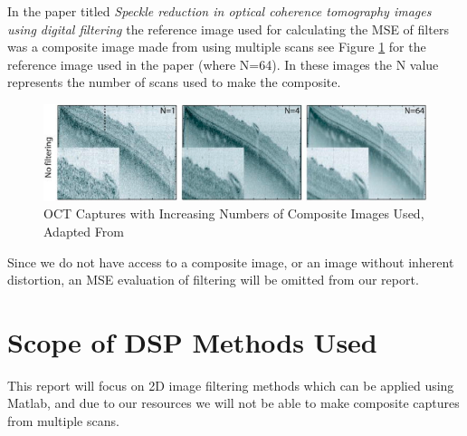 \documentclass[%
reprint,
showpacs,preprintnumbers,
bibnotes,
amsmath,amssymb,
aps,
pra,
]{revtex4-1}
\begin{document}
	  	In the paper titled \textit{Speckle reduction in optical coherence tomography images using digital filtering} \cite{ozcan_speckle_2007} the reference image used for calculating the MSE of filters was a composite image made from using multiple scans see Figure \ref{fig:Composite} for the reference image used in the paper (where N=64). In these images the N value represents the number of scans used to make the composite.

	  	\begin{figure}
	    	\centering
	    	\includegraphics[width=0.8\linewidth]{Figures/composite}
	    	\caption{OCT Captures with Increasing Numbers of Composite Images Used, Adapted From \cite{ozcan_speckle_2007}}
	    	\label{fig:Composite}
	 	\end{figure}

	  	Since we do not have access to a composite image, or an image without inherent distortion, an MSE evaluation of filtering will be omitted from our report.
	\section{\label{sec:level1} Scope of DSP Methods Used}

	This report will focus on 2D image filtering methods which can be applied using Matlab, and due to our resources we will not be able to make composite captures from multiple scans.
\end{document}
